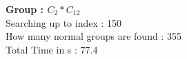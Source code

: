 \textbf{Group : $C_2*C_{12}$}\\
Searching up to index : 150\\
How many normal groups are found : 355\\
Total Time in s : 77.4\\

